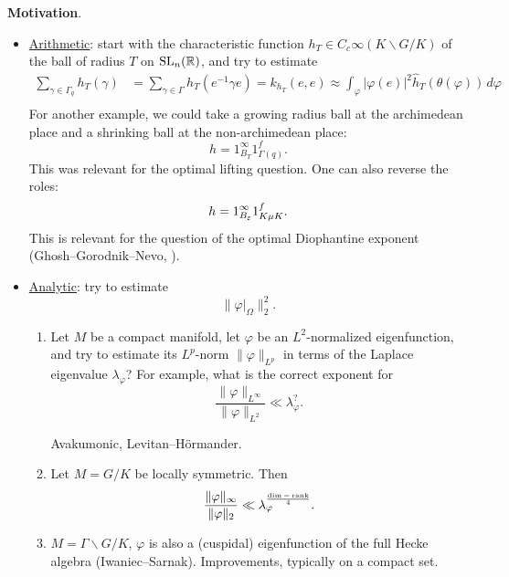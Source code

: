 \documentclass[reqno]{amsart} 
\begin{document}
\textbf{Motivation}.
\begin{itemize}
\item \underline{Arithmetic}: start with the characteristic function $h_T \in C_c \infty (K \backslash G / K)$ of the ball of radius $T$ on $\operatorname{SL}_n(\mathbb{R})$, and try to estimate
  \begin{align*}
    \sum_{\gamma \in \Gamma_q } h_T (\gamma)
    &= \sum_{\gamma \in \Gamma } h_T (e^{-1} \gamma e)
      = k_{h_T } (e, e)
      \approx \int_{\varphi }
      \lvert \varphi (e) \rvert^2
      \hat{h}_T (\theta (\varphi) ) \, d \varphi \\
  \end{align*}
  For another example, we could take a growing radius ball at the archimedean place and a shrinking ball at the non-archimedean place:
  \begin{equation*}
    h = 1_{B_T }^\infty 1_{\Gamma (q) }^f.
  \end{equation*}
  This was relevant for the optimal lifting question.  One can also reverse the roles:
  \begin{equation*}
    h = 1_{B_\varepsilon }^\infty 1_{K \mu K}^f.
  \end{equation*}
  This is relevant for the question of the optimal Diophantine exponent (Ghosh--Gorodnik--Nevo, ).
\item \underline{Analytic}: try to estimate
  \begin{equation*}
    \lVert \varphi |_{\Omega} \rVert_2^2.
  \end{equation*}
  \begin{enumerate}
  \item Let $M$ be a compact manifold, let $\varphi$ be an $L^2$-normalized eigenfunction, and try to estimate its $L^p $-norm $\lVert \varphi \rVert_{L^p }$ in terms of the Laplace eigenvalue $\lambda_\varphi$?  For example, what is the correct exponent for
    \begin{equation*}
      \frac{\lVert \varphi  \rVert_{L^\infty  }}{ \lVert \varphi  \rVert_{L^2 }}
      \ll
      \lambda_\varphi^{?}.
    \end{equation*}
    
    Avakumonic, Levitan--H{\"o}rmander.
  \item Let $M = G / K$ be locally symmetric.  Then
    \begin{equation*}
      \frac{\lVert \varphi  \rVert _\infty }{ \lVert \varphi  \rVert_2 }
      \ll
      \lambda_\varphi^{ \frac{\dim - \operatorname{rank}}{4}}.
    \end{equation*}
  \item $M = \Gamma \backslash G / K$, $\varphi$ is also a (cuspidal) eigenfunction of the full Hecke algebra (Iwaniec--Sarnak).  Improvements, typically on a compact set.
  \end{enumerate}
\end{itemize}
\end{document}
